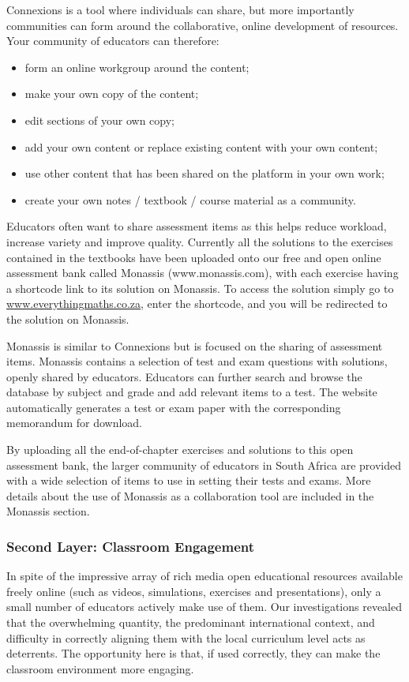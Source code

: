 Connexions is a tool where individuals can share, but more importantly communities can form around the collaborative, online development of resources. Your community of educators can therefore:
\begin{itemize}
\item form an online workgroup around the content;
\item make your own copy of the content;
\item edit sections of your own copy;
\item add your own content or replace existing content with your own content;
\item use other content that has been shared on the platform in your own work;
\item create your own notes / textbook / course material as a community.
\end{itemize}
Educators often want to share assessment items as this helps reduce workload, increase variety and improve quality. Currently all the solutions to the exercises contained in the textbooks have been uploaded onto our free and open online assessment bank called Monassis (www.monassis.com), with each exercise having a shortcode link to its solution on Monassis. To access the solution simply go to \url{www.everythingmaths.co.za},  enter the shortcode, and you will be redirected to the solution on Monassis.\par

Monassis is similar to Connexions but is focused on the sharing of assessment items. Monassis contains a selection of test and exam questions with solutions, openly shared by educators. Educators can further search and browse the database by subject and grade and add relevant items to a test. The website automatically generates a test or exam paper with the corresponding memorandum for download.\par

By uploading all the end-of-chapter exercises and solutions to this open assessment bank, the larger community of educators in South Africa are provided with a wide selection of items to use in setting their tests and exams. More details about the use of Monassis as a collaboration tool are included in the Monassis section.\par

\subsubsection{Second Layer: Classroom Engagement}
In spite of the impressive array of rich media open educational resources available freely online (such as videos, simulations, exercises and presentations), only a small number of educators actively make use of them. Our investigations revealed that the overwhelming quantity, the predominant international context, and difficulty in correctly aligning them with the local curriculum level acts as deterrents. The opportunity here is that, if used correctly, they can make the classroom environment more engaging.\par

